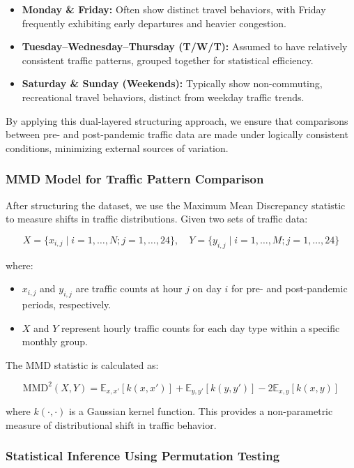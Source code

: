 \documentclass{article}
\begin{document}
\begin{itemize}
    \item \textbf{Monday \& Friday:} Often show distinct travel behaviors, with Friday frequently exhibiting early departures and heavier congestion.
    \item \textbf{Tuesday–Wednesday–Thursday (T/W/T):} Assumed to have relatively consistent traffic patterns, grouped together for statistical efficiency.
    \item \textbf{Saturday \& Sunday (Weekends):} Typically show non-commuting, recreational travel behaviors, distinct from weekday traffic trends.
\end{itemize}

By applying this dual-layered structuring approach, we ensure that comparisons between pre- and post-pandemic traffic data are made under logically consistent conditions, minimizing external sources of variation.

\subsubsection{MMD Model for Traffic Pattern Comparison}

After structuring the dataset, we use the Maximum Mean Discrepancy statistic to measure shifts in traffic distributions. Given two sets of traffic data:

\[
X = \{x_{i,j} \mid i = 1, \dots, N; j = 1, \dots, 24\}, \quad Y = \{y_{i,j} \mid i = 1, \dots, M; j = 1, \dots, 24\}
\]

where:

\begin{itemize}
    \item $x_{i,j}$ and $y_{i,j}$ are traffic counts at hour $j$ on day $i$ for pre- and post-pandemic periods, respectively.
    \item $X$ and $Y$ represent hourly traffic counts for each day type within a specific monthly group.
\end{itemize}

The MMD statistic is calculated as:

\[
\text{MMD}^2(X, Y) = \mathbb{E}_{x,x'}[k(x, x')] + \mathbb{E}_{y,y'}[k(y, y')] - 2\mathbb{E}_{x,y}[k(x, y)]
\]

where \( k(\cdot, \cdot) \) is a Gaussian kernel function. This provides a non-parametric measure of distributional shift in traffic behavior.

\subsubsection{Statistical Inference Using Permutation Testing}
\end{document}
